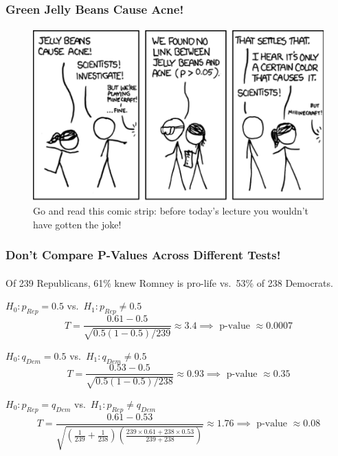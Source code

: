 \documentclass[handout]{beamer}
\begin{document}
\begin{frame}
\frametitle{Green Jelly Beans Cause Acne!}
\framesubtitle{\href{http://xkcd.com/882/}{}}
\begin{figure}
\centering
	\includegraphics[scale=0.45]{./images/xkcd1}
	\caption{Go and read this comic strip: before today's lecture you wouldn't have gotten the joke!}
\end{figure}
\end{frame}

\begin{frame}
\frametitle{Don't Compare P-Values Across Different Tests!}
\framesubtitle{}


\footnotesize

Of 239 Republicans, 61\% knew Romney is pro-life vs.\ 53\% of 238 Democrats.
\pause
\begin{block}{$H_0\colon p_{Rep} = 0.5$ vs.\ $H_1\colon p_{Rep} \neq 0.5$}
 $$T = \frac{0.61 - 0.5}{\sqrt{0.5(1-0.5)/239}} \approx  3.4 \implies \mbox{ p-value } \approx 0.0007$$
\end{block}
\pause
\begin{block}{$H_0\colon q_{Dem} = 0.5$ vs.\ $H_1\colon q_{Dem} \neq 0.5$}
 $$T = \frac{0.53 - 0.5}{\sqrt{0.5(1-0.5)/238}} \approx 0.93  \implies \mbox{ p-value } \approx 0.35$$
\end{block}
\pause
\begin{block}{$H_0\colon p_{Rep} =q_{Dem}$ vs.\ $H_1\colon p_{Rep} \neq q_{Dem}$}
 $$T = \frac{0.61 - 0.53}{\sqrt{\left(\frac{1}{239}+ \frac{1}{238}\right)\left(\frac{239 \times 0.61 + 238 \times 0.53}{239 + 238}\right)}} \approx  1.76 \implies \mbox{ p-value } \approx 0.08$$
\end{block}


\end{frame}
\end{document}

